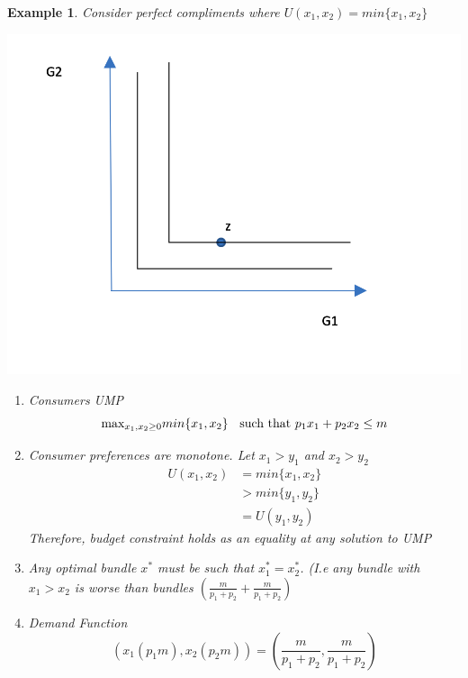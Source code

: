 \documentclass[twoside]{article}
\newtheorem{ex}[theorem]{Example}
\begin{document}
\begin{ex} Consider perfect compliments where \(U(x_1, x_2) = min \{x_1, x_2\}\)
\begin{center}
\includegraphics[scale=0.3]{6}
\end{center}
\begin{enumerate}
\item Consumers UMP 
\[\text{max}_{x_1, x_2 \geq 0} min\{x_1, x_2\} \hspace{0.2cm} \text{ such that } p_1x_1 + p_2x_2 \leq m \]
\item Consumer preferences are monotone. Let \(x_1 > y_1\) and \(x_2 > y_2\)
\[\begin{aligned}
U(x_1, x_2) & = min \{x_1, x_2\} \\
& > min  \{y_1, y_2\} \\
& = U(y_1, y_2) 
\end{aligned}\]
Therefore, budget constraint holds as an equality at any solution to UMP 
\item Any optimal bundle \(x^*\) must be such that \(x_1^* = x_2^*\). (I.e any bundle with \(x_1 > x_2\) is worse than bundles \(\left( \frac{m}{p_1 + p_2} + \frac{m}{p_1 + p_2} \right) \)
\item Demand Function
\[(x_1 (p_1m), x_2 (p_2 m) ) = \left(\frac{m}{p_1 + p_2} , \frac{m}{p_1 + p_2}  \right)\]
\end{enumerate}
\end{ex}
\end{document}
